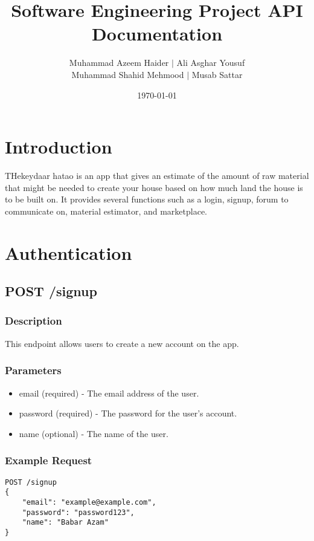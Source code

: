 \documentclass{article}
\title{Software Engineering Project API Documentation}
\author{Muhammad Azeem Haider $\mid$ Ali Asghar Yousuf \\
      Muhammad Shahid Mehmood $\mid$ Musab Sattar}
\date{\today}
\begin{document}
\maketitle

\section{Introduction}

THekeydaar hatao is an app that gives an estimate of the amount of raw material that might be needed to create your house based on how much land the house is to be built on. It provides several functions such as a login, signup, forum to communicate on, material estimator, and marketplace.

\section{Authentication}

\subsection{POST /signup}

\subsubsection{Description}

This endpoint allows users to create a new account on the app.

\subsubsection{Parameters}

\begin{itemize}
\item email (required) - The email address of the user.
\item password (required) - The password for the user's account.
\item name (optional) - The name of the user.
\end{itemize}

\subsubsection{Example Request}

\begin{verbatim}
POST /signup
{
    "email": "example@example.com",
    "password": "password123",
    "name": "Babar Azam"
}
\end{verbatim}
\end{document}
